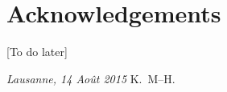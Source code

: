 \chapter*{Acknowledgements}
[To do later]

\bigskip
 
\noindent\textit{Lausanne, 14 Ao\^{u}t 2015}
\hfill K.~M--H.
